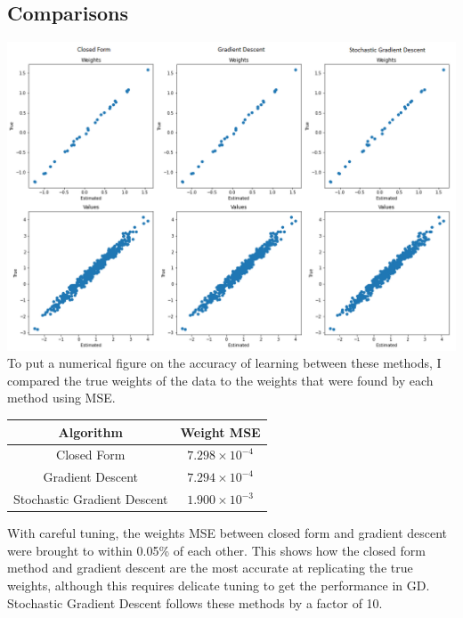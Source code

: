 \subsection{Comparisons}
\includegraphics[width=\linewidth]{figs/LinRegComparison.png}
To put a numerical figure on the accuracy of learning between these methods, I compared the true weights of the data to the weights that were found by each method using MSE. 
\begin{center}
    \begin{tabular}{| c c |}
        \hline
        Algorithm & Weight MSE \\ 
        \hline\hline
        Closed Form & $7.298 \times 10^{-4}$\\ 
        Gradient Descent & $7.294 \times 10^{-4}$ \\
        Stochastic Gradient Descent & $1.900 \times 10^{-3}$\\
        \hline      
    \end{tabular}
\end{center}
With careful tuning, the weights MSE between closed form and gradient descent were brought to within 0.05\% of each other. 
This shows how the closed form method and gradient descent are the most accurate at replicating the true weights, although this requires delicate tuning to get the performance in GD. Stochastic Gradient Descent follows these methods by a factor of 10.

